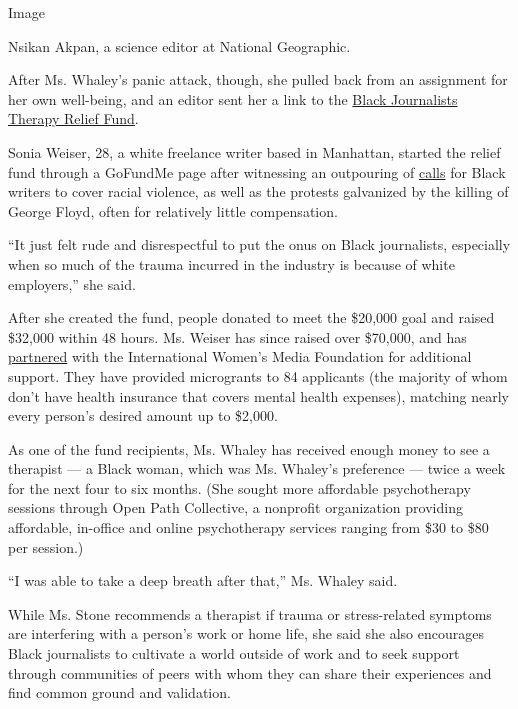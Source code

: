 Image

Nsikan Akpan, a science editor at National Geographic.

After Ms. Whaley's panic attack, though, she pulled back from an
assignment for her own well-being, and an editor sent her a link to the
\href{https://www.gofundme.com/f/black-journalists-therapy-relief-fund}{Black
Journalists Therapy Relief Fund}.

Sonia Weiser, 28, a white freelance writer based in Manhattan, started
the relief fund through a GoFundMe page after witnessing an outpouring
of
\href{https://twitter.com/weischoice/status/1270755036294000640}{calls}
for Black writers to cover racial violence, as well as the protests
galvanized by the killing of George Floyd, often for relatively little
compensation.

``It just felt rude and disrespectful to put the onus on Black
journalists, especially when so much of the trauma incurred in the
industry is because of white employers,'' she said.

After she created the fund, people donated to meet the \$20,000 goal and
raised \$32,000 within 48 hours. Ms. Weiser has since raised over
\$70,000, and has
\href{https://iwmf.submittable.com/submit/25d0d67f-9c98-4813-9259-7d80bca55195/joint-application-form-for-iwmf-u-s-journalism-emergency-fund-and-black-journali}{partnered}
with the International Women's Media Foundation for additional support.
They have provided microgrants to 84 applicants (the majority of whom
don't have health insurance that covers mental health expenses),
matching nearly every person's desired amount up to \$2,000.

As one of the fund recipients, Ms. Whaley has received enough money to
see a therapist --- a Black woman, which was Ms. Whaley's preference ---
twice a week for the next four to six months. (She sought more
affordable psychotherapy sessions through Open Path Collective, a
nonprofit organization providing affordable, in-office and online
psychotherapy services ranging from \$30 to \$80 per session.)

``I was able to take a deep breath after that,'' Ms. Whaley said.

While Ms. Stone recommends a therapist if trauma or stress-related
symptoms are interfering with a person's work or home life, she said she
also encourages Black journalists to cultivate a world outside of work
and to seek support through communities of peers with whom they can
share their experiences and find common ground and validation.

